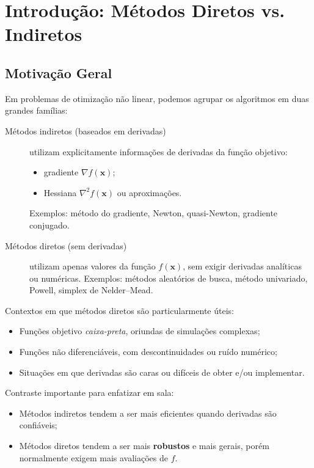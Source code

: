 \documentclass[9pt,a4paper]{extarticle}
\begin{document}
\section{Introdução: Métodos Diretos vs. Indiretos}

\subsection{Motivação Geral}

Em problemas de otimização não linear, podemos agrupar os algoritmos em duas grandes famílias:

\begin{description}
    \item[Métodos indiretos (baseados em derivadas)] utilizam explicitamente informações de derivadas da função objetivo:
    \begin{itemize}
        \item gradiente $\nabla f(\bm{x})$;
        \item Hessiana $\nabla^2 f(\bm{x})$ ou aproximações.
    \end{itemize}
    Exemplos: método do gradiente, Newton, quasi-Newton, gradiente conjugado.
    \item[Métodos diretos (sem derivadas)] utilizam apenas valores da função $f(\bm{x})$, sem exigir derivadas analíticas ou numéricas.
    Exemplos: métodos aleatórios de busca, método univariado, Powell, simplex de Nelder--Mead.
\end{description}

Contextos em que métodos diretos são particularmente úteis:
\begin{itemize}
    \item Funções objetivo \emph{caixa-preta}, oriundas de simulações complexas;
    \item Funções não diferenciáveis, com descontinuidades ou ruído numérico;
    \item Situações em que derivadas são caras ou difíceis de obter e/ou implementar.
\end{itemize}

Contraste importante para enfatizar em sala:
\begin{itemize}
    \item Métodos indiretos tendem a ser mais eficientes quando derivadas são confiáveis;
    \item Métodos diretos tendem a ser mais \textbf{robustos} e mais gerais, porém normalmente exigem mais avaliações de $f$.
\end{itemize}
\end{document}
